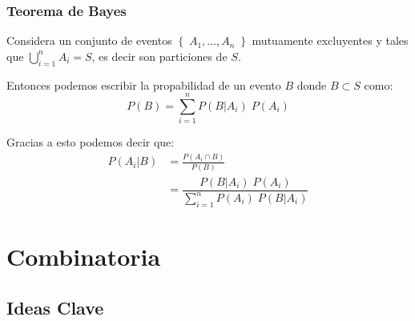 \documentclass[12pt, fleqn]{report}                             %
\theoremstyle{break}                                            %
\newcommand{\Set}[1]{\left\{ \; #1 \; \right\}}                 %
\begin{document}
            \clearpage
            \subsection{Teorema de Bayes}

                Considera un conjunto de eventos $\Set{A_1, \dots, A_n}$ mutuamente excluyentes
                y tales que $\displaystyle \bigcup_{i=1}^n A_i = S$, es decir son particiones de $S$.

                Entonces podemos escribir la propabilidad de un evento $B$ donde $B \subset S$ como:
                \begin{equation*}
                    P(B) 
                        = \sum_{i = 1}^n P(B | A_i) \; P(A_i) 
                \end{equation*}


                Gracias a esto podemos decir que:
                \begin{align*}
                    P(A_i | B) 
                        &= \frac{P(A_i \cap B)}{P(B)}                                                        \\
                        &= \dfrac{P(B | A_i) \; P(A_i)}{\displaystyle \sum_{i = 1}^n P(A_i) \; P(B | A_i)}
                \end{align*}





    \chapter{Combinatoria}

        \clearpage
        \section{Ideas Clave}
\end{document}
